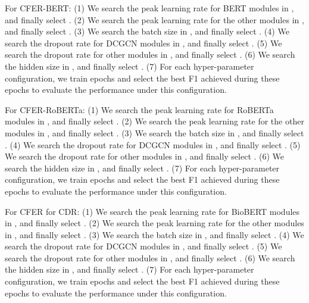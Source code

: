 \documentclass{article}
\begin{document}
For CFER-BERT: 
(1) We search the peak learning rate for BERT modules in , and finally select .
(2) We search the peak learning rate for the other modules in , and finally select . 
(3) We search the batch size in , and finally select .
(4) We search the dropout rate for DCGCN modules in , and finally select .
(5) We search the dropout rate for other modules in , and finally select . 
(6) We search the hidden size in , and finally select . 
(7) For each hyper-parameter configuration, we train  epochs and select the best F1 achieved during these  epochs to evaluate the performance under this configuration. 

For CFER-RoBERTa: 
(1) We search the peak learning rate for RoBERTa modules in , and finally select . 
(2) We search the peak learning rate for the other modules in , and finally select . 
(3) We search the batch size in , and finally select .
(4) We search the dropout rate for DCGCN modules in , and finally select .
(5) We search the dropout rate for other modules in , and finally select .
(6) We search the hidden size in , and finally select . 
(7) For each hyper-parameter configuration, we train  epochs and select the best F1 achieved during these  epochs to evaluate the performance under this configuration. 

For CFER for CDR: 
(1) We search the peak learning rate for BioBERT modules in , and finally select . 
(2) We search the peak learning rate for the other modules in , and finally select . 
(3) We search the batch size in , and finally select .
(4) We search the dropout rate for DCGCN modules in , and finally select .
(5) We search the dropout rate for other modules in , and finally select .
(6) We search the hidden size in , and finally select . 
(7) For each hyper-parameter configuration, we train  epochs and select the best F1 achieved during these  epochs to evaluate the performance under this configuration. 
\end{document}
